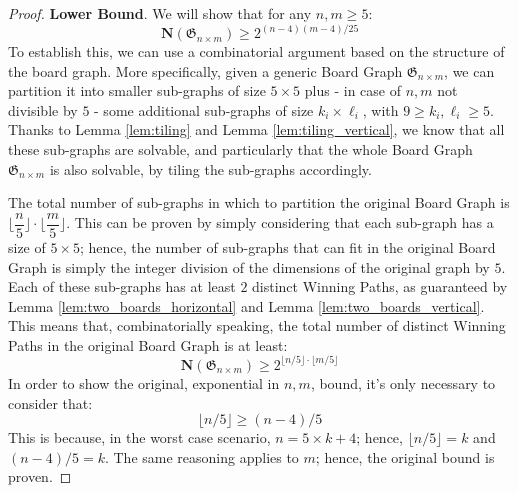 \documentclass[conference]{IEEEtran}
\begin{document}
\vspace{0.6em}
\begin{proof}
    \textbf{Lower Bound}. We will show that for any $n, m \ge 5$:
    $$
        \mathbf{N}(\mathfrak{G}_{n \times m}) \ge 2^{(n - 4)(m - 4)/25}
    $$
    To establish this, we can use a combinatorial argument based on the structure of the board graph.
    More specifically, given a generic Board Graph $\mathfrak{G}_{n \times m}$, we can partition it into smaller sub-graphs of size $5 \times 5$ plus - in case of $n,m$ not divisible by $5$ - some additional sub-graphs of size $k_i \times \ell_i$, with $9 \ge k_i, \ell_i \ge 5$.
    Thanks to Lemma \ref{lem:tiling} and Lemma \ref{lem:tiling_vertical}, we know that all these sub-graphs are solvable, and particularly that the whole Board Graph $\mathfrak{G}_{n \times m}$ is also solvable, by tiling the sub-graphs accordingly.
    
    The total number of sub-graphs in which to partition the original Board Graph is $\lfloor\dfrac{n}{5}\rfloor \cdot \lfloor\dfrac{m}{5}\rfloor$.
    This can be proven by simply considering that each sub-graph has a size of $5 \times 5$; hence, the number of sub-graphs that can fit in the original Board Graph is simply the integer division of the dimensions of the original graph by $5$.
    Each of these sub-graphs has at least $2$ distinct Winning Paths, as guaranteed by Lemma \ref{lem:two_boards_horizontal} and Lemma \ref{lem:two_boards_vertical}.
    This means that, combinatorially speaking, the total number of distinct Winning Paths in the original Board Graph is at least:
    $$
        \mathbf{N}(\mathfrak{G}_{n \times m}) \ge 2^{\lfloor n/5 \rfloor \cdot \lfloor m/5 \rfloor}
    $$
    In order to show the original, exponential in $n,m$, bound, it's only necessary to consider that:
    $$
        \lfloor n/5 \rfloor \ge (n - 4)/5
    $$
    This is because, in the worst case scenario, $n = 5 \times k + 4$; hence, $\lfloor n/5 \rfloor = k$ and $(n - 4)/5 = k$.
    The same reasoning applies to $m$; hence, the original bound is proven.
\end{proof}
\end{document}
